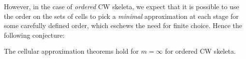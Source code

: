 \documentclass{easychair}
\begin{document}
%
However, in the case of \emph{ordered} CW skeleta, we expect that it is possible to use the order
on the sets of cells to pick a \emph{minimal} approximation at each stage for some carefully defined
order, which eschews the need for finite choice.
%
Hence the following conjecture:

\begin{conjecture}\label{conj1}
  The cellular approximation theorems hold for $m = \infty$ for ordered CW skeleta.
\end{conjecture}


\label{sect:bib}

%
%
%



\end{document}
